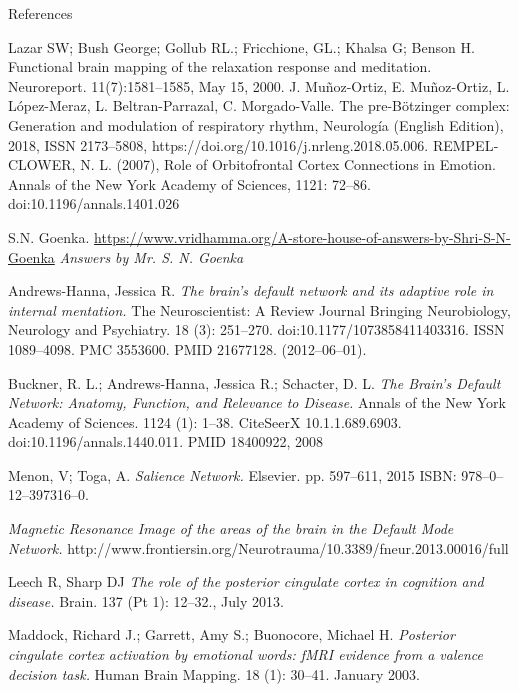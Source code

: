 \documentclass[twocolumn]{article}
\begin{document}
\pagebreak


References

Lazar SW; Bush George; Gollub RL.; Fricchione, GL.; Khalsa G; Benson H. Functional brain mapping of the relaxation response and meditation.
Neuroreport. 11(7):1581–1585, May 15, 2000.
J. Muñoz-Ortiz, E. Muñoz-Ortiz, L. López-Meraz, L. Beltran-Parrazal, C. Morgado-Valle. The pre-Bötzinger complex: Generation and modulation of respiratory rhythm, Neurología (English Edition), 2018, ISSN 2173–5808,
https://doi.org/10.1016/j.nrleng.2018.05.006.
REMPEL‐CLOWER, N. L. (2007), Role of Orbitofrontal Cortex Connections in
Emotion. Annals of the New York Academy of Sciences, 1121:
72–86. doi:10.1196/annals.1401.026


\pagebreak

\begin{thebibliography}{9}
\raggedright

  S.N. Goenka.
  \url{https://www.vridhamma.org/A-store-house-of-answers-by-Shri-S-N-Goenka}
  \textit{Answers by Mr. S. N. Goenka}

  Andrews-Hanna, Jessica R.
  \textit{The brain’s default network and its adaptive role in internal mentation.}
  The Neuroscientist: A Review Journal Bringing Neurobiology, Neurology and
  Psychiatry. 18 (3): 251–270. doi:10.1177/1073858411403316. ISSN 1089–4098. PMC
  3553600. PMID 21677128. (2012–06–01).

  Buckner, R. L.; Andrews-Hanna, Jessica R.; Schacter, D. L.
  \textit{The Brain's Default Network: Anatomy, Function, and Relevance to Disease.}
  Annals of the New York Academy of Sciences. 1124 (1): 1–38. CiteSeerX
  10.1.1.689.6903. doi:10.1196/annals.1440.011. PMID 18400922, 2008

  Menon, V; Toga, A.
  \textit{Salience Network.}
  Elsevier. pp. 597–611, 2015
  ISBN: 978–0–12–397316–0.

  \textit{Magnetic Resonance Image of the areas of the brain in the Default Mode Network.}
  http://www.frontiersin.org/Neurotrauma/10.3389/fneur.2013.00016/full

  Leech R, Sharp DJ
  \textit{The role of the posterior cingulate cortex in cognition and disease.}
  Brain. 137 (Pt 1): 12–32., July 2013.

  Maddock, Richard J.; Garrett, Amy S.; Buonocore, Michael H.
  \textit{Posterior cingulate cortex activation by emotional words: fMRI evidence from a
    valence decision task.}
  Human Brain Mapping. 18 (1): 30–41. January 2003.


\end{thebibliography}
\end{document}
